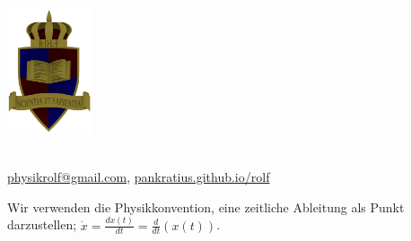 \documentclass[a4paper]{article}
\begin{document}
	\vspace*{-2cm}
	\parbox{4cm}{\includegraphics[width=2.5cm]{../images/ROLF4.png}}
	\parbox{10.6cm}{ \\ \href{mailto:physikrolf@gmail.com}{physikrolf@gmail.com}, \url{pankratius.github.io/rolf} \\ \vspace*{-.5cm} }
	\begin{framed}
		\small
	Wir verwenden die Physikkonvention, eine zeitliche Ableitung als Punkt darzustellen; $\dot{x} = \frac{dx\left(t\right)}{dt} = \frac{d}{dt}\left(x\left(t\right)\right)$.
	\end{framed}
	

\thispagestyle{empty}


\noindent








%
%
\end{document}
